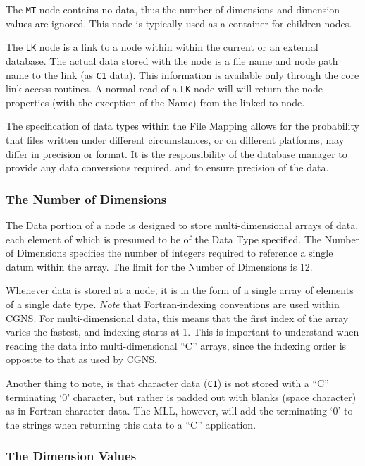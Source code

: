 The \texttt{MT} node contains no data, thus the number of dimensions and
dimension values are ignored. This node is typically used as a container
for children nodes.

The \texttt{LK} node is a link to a node within within the current or
an external database. The actual data stored with the node is a file name
and node path name to the link (as \texttt{C1} data). This information
is available only through the core link access routines. A normal
read of a \texttt{LK} node will will return the node properties
(with the exception of the Name) from the linked-to node.

The specification of data types within the File Mapping allows for the
probability that files written under different circumstances, or on
different platforms, may differ in precision or format. It is the
responsibility of the database manager to provide any data conversions
required, and to ensure precision of the data.

\subsubsection{The Number of Dimensions}

The Data portion of a node is designed to store multi-dimensional arrays
of data, each element of which is presumed to be of the Data Type
specified. The Number of Dimensions specifies the number of integers
required to reference a single datum within the array. The limit for
the Number of Dimensions is 12.

Whenever data is stored at a node, it is in the form of a single array
of elements of a single date type. \textit{Note} that Fortran-indexing
conventions are  used within CGNS. For multi-dimensional data, this means
that the first index of the array varies the fastest, and indexing
starts at 1. This is important to understand when reading the data
into multi-dimensional ``C'' arrays, since the indexing order is opposite
to that as used by CGNS.

Another thing to note, is that character data (\texttt{C1}) is not
stored with a ``C'' terminating `0' character, but rather is padded out
with blanks (space character) as in Fortran character data. The MLL,
however, will add the terminating-`0' to the strings when returning
this data to a ``C'' application.

\subsubsection{The Dimension Values}

